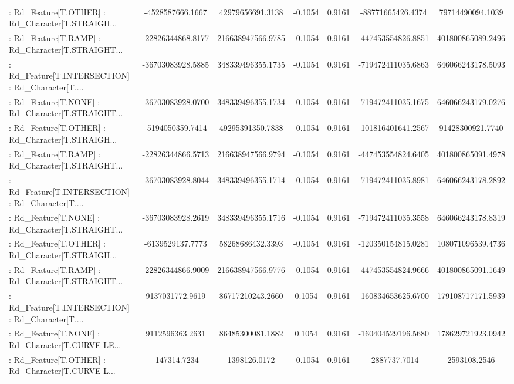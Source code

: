\begin{longtable}{p{4cm}cccccc}
 : Rd\_Feature[T.OTHER] : Rd\_Character[T.STRAIGH... &  -4528587666.1667 &  42979656691.3138 & -0.1054 &       0.9161 &  -88771665426.4374 &  79714490094.1039 \\
 : Rd\_Feature[T.RAMP] : Rd\_Character[T.STRAIGHT... & -22826344868.8177 & 216638947566.9785 & -0.1054 &       0.9161 & -447453554826.8851 & 401800865089.2496 \\
 : Rd\_Feature[T.INTERSECTION] : Rd\_Character[T.... & -36703083928.5885 & 348339496355.1735 & -0.1054 &       0.9161 & -719472411035.6863 & 646066243178.5093 \\
 : Rd\_Feature[T.NONE] : Rd\_Character[T.STRAIGHT... & -36703083928.0700 & 348339496355.1734 & -0.1054 &       0.9161 & -719472411035.1675 & 646066243179.0276 \\
 : Rd\_Feature[T.OTHER] : Rd\_Character[T.STRAIGH... &  -5194050359.7414 &  49295391350.7838 & -0.1054 &       0.9161 & -101816401641.2567 &  91428300921.7740 \\
 : Rd\_Feature[T.RAMP] : Rd\_Character[T.STRAIGHT... & -22826344866.5713 & 216638947566.9794 & -0.1054 &       0.9161 & -447453554824.6405 & 401800865091.4978 \\
 : Rd\_Feature[T.INTERSECTION] : Rd\_Character[T.... & -36703083928.8044 & 348339496355.1714 & -0.1054 &       0.9161 & -719472411035.8981 & 646066243178.2892 \\
 : Rd\_Feature[T.NONE] : Rd\_Character[T.STRAIGHT... & -36703083928.2619 & 348339496355.1716 & -0.1054 &       0.9161 & -719472411035.3558 & 646066243178.8319 \\
 : Rd\_Feature[T.OTHER] : Rd\_Character[T.STRAIGH... &  -6139529137.7773 &  58268686432.3393 & -0.1054 &       0.9161 & -120350154815.0281 & 108071096539.4736 \\
 : Rd\_Feature[T.RAMP] : Rd\_Character[T.STRAIGHT... & -22826344866.9009 & 216638947566.9776 & -0.1054 &       0.9161 & -447453554824.9666 & 401800865091.1649 \\
 : Rd\_Feature[T.INTERSECTION] : Rd\_Character[T.... &   9137031772.9619 &  86717210243.2660 &  0.1054 &       0.9161 & -160834653625.6700 & 179108717171.5939 \\
 : Rd\_Feature[T.NONE] : Rd\_Character[T.CURVE-LE... &   9112596363.2631 &  86485300081.1882 &  0.1054 &       0.9161 & -160404529196.5680 & 178629721923.0942 \\
 : Rd\_Feature[T.OTHER] : Rd\_Character[T.CURVE-L... &      -147314.7234 &      1398126.0172 & -0.1054 &       0.9161 &      -2887737.7014 &      2593108.2546 \\

\end{longtable}
